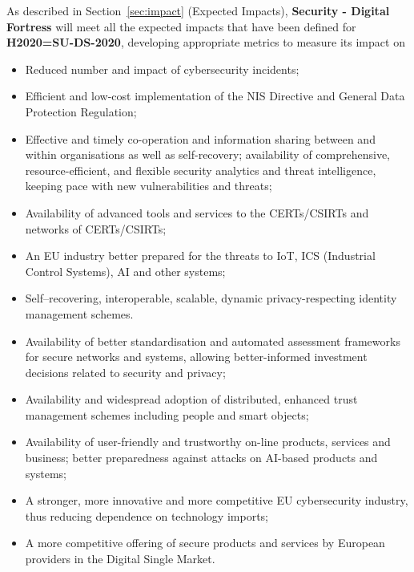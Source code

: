 \documentclass[a4paper,11pt]{article}
\newcommand{\project}[1]{\textbf{#1}\xspace}
\newcommand{\SECURITY}{\project{Security - Digital Fortress}}
\newcommand{\TheProject}{\SECURITY}
\begin{document}
As described in Section~\ref{sec:impact} (Expected Impacts), \TheProject{} will meet all the expected impacts that have been defined for \textbf{H2020=SU-DS-2020}, developing appropriate metrics to measure its impact on
\begin{itemize}
\item Reduced number and impact of cybersecurity incidents;
\item Efficient and low-cost implementation of the NIS Directive and General Data Protection Regulation;
\item Effective and timely co-operation and information sharing between and within organisations as well as self-recovery;
availability of comprehensive, resource-efficient, and flexible security analytics and threat intelligence, keeping pace with new vulnerabilities and threats;
\item Availability of advanced tools and services to the CERTs/CSIRTs and networks of CERTs/CSIRTs;
\item An EU industry better prepared for the threats to IoT, ICS (Industrial Control Systems), AI and other systems;
\item Self–recovering, interoperable, scalable, dynamic privacy-respecting identity management schemes.
\item Availability of better standardisation and automated assessment frameworks for secure networks and systems, allowing better-informed investment decisions related to security and privacy;
\item Availability and widespread adoption of distributed, enhanced trust management schemes including people and smart objects;
\item Availability of user-friendly and trustworthy on-line products, services and business;
better preparedness against attacks on AI-based products and systems;
\item A stronger, more innovative and more competitive EU cybersecurity industry, thus reducing dependence on technology imports;
\item A more competitive offering of secure products and services by European providers in the Digital Single Market.
\end{itemize}
\end{document}
